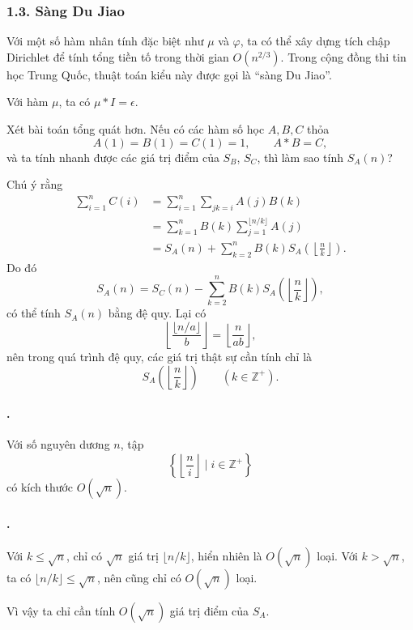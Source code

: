 \documentclass[11pt]{article}
\begin{document}
\subsubsection*{1.3. Sàng Du Jiao}

Với một số hàm nhân tính đặc biệt như \(\mu\) và \(\varphi\), ta có thể xây
dựng tích chập Dirichlet để tính tổng tiền tố trong thời gian \(O(n^{2/3})\).
Trong cộng đồng thi tin học Trung Quốc, thuật toán kiểu này được gọi là
``sàng Du Jiao''.

Với hàm \(\mu\), ta có \(\mu*I=\epsilon\).

Xét bài toán tổng quát hơn. Nếu có các hàm số học \(A,B,C\) thỏa
\[
  A(1)=B(1)=C(1)=1,\qquad A*B=C,
\]
và ta tính nhanh được các giá trị điểm của \(S_B\), \(S_C\), thì làm sao tính
\(S_A(n)\)?

Chú ý rằng
\[
\begin{aligned}
  \sum_{i=1}^{n} C(i)
  &= \sum_{i=1}^{n}\sum_{jk=i} A(j)B(k) \\
  &= \sum_{k=1}^{n} B(k)\sum_{j=1}^{\lfloor n/k\rfloor} A(j) \\
  &= S_A(n)+\sum_{k=2}^{n} B(k)S_A\left(\left\lfloor\frac{n}{k}\right\rfloor\right).
\end{aligned}
\]
Do đó
\[
  S_A(n)=S_C(n)-\sum_{k=2}^{n}
  B(k)S_A\left(\left\lfloor\frac{n}{k}\right\rfloor\right),
\]
có thể tính \(S_A(n)\) bằng đệ quy. Lại có
\[
  \left\lfloor\frac{\lfloor n/a\rfloor}{b}\right\rfloor
  = \left\lfloor\frac{n}{ab}\right\rfloor,
\]
nên trong quá trình đệ quy, các giá trị thật sự cần tính chỉ là
\[
  S_A\left(\left\lfloor\frac{n}{k}\right\rfloor\right)
  \qquad (k\in\mathbb Z^+).
\]

\paragraph{.}
Với số nguyên dương \(n\), tập
\[
  \left\{\left\lfloor\frac{n}{i}\right\rfloor\mid i\in\mathbb Z^+\right\}
\]
có kích thước \(O(\sqrt n)\).

\paragraph{.}
Với \(k\le\sqrt n\), chỉ có \(\sqrt n\) giá trị
\(\lfloor n/k\rfloor\), hiển nhiên là \(O(\sqrt n)\) loại. Với
\(k>\sqrt n\), ta có \(\lfloor n/k\rfloor\le\sqrt n\), nên cũng chỉ có
\(O(\sqrt n)\) loại.

Vì vậy ta chỉ cần tính \(O(\sqrt n)\) giá trị điểm của \(S_A\).
\end{document}
